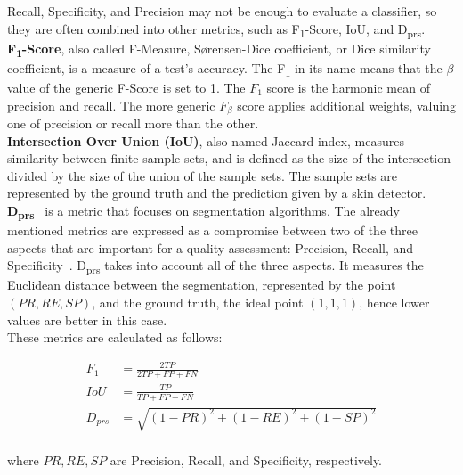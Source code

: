 \noindent Recall, Specificity, and Precision may not be enough to evaluate a classifier, so they are often combined into other metrics, such as F\textsubscript{1}-Score, IoU, and D\textsubscript{prs}.\\
\textbf{F\textsubscript{1}-Score}, also called F-Measure, Sørensen-Dice coefficient, or Dice similarity coefficient, is a measure of a test's accuracy.
The F\textsubscript{1} in its name means that the $\beta$ value of the generic F-Score is set to 1.
The $F_1$ score is the harmonic mean of precision and recall.
The more generic $F_\beta$ score applies additional weights, valuing one of precision or recall more than the other.\\
\textbf{Intersection Over Union (IoU)}, also named Jaccard index, measures similarity between finite sample sets, and is defined as the size of the intersection divided by the size of the union of the sample sets. The sample sets are represented by the ground truth and the prediction given by a skin detector.\\
\textbf{D\textsubscript{prs}}~\cite{intawong2013new} is a metric that focuses on segmentation algorithms. The already mentioned metrics are expressed as a compromise between two of the three aspects that are important for a quality assessment: Precision, Recall, and Specificity~\cite{intawong2013new}.
D\textsubscript{prs} takes into account all of the three aspects.
It measures the Euclidean distance between the segmentation, represented by the point $(PR, RE, SP)$, and the ground truth, the ideal point $(1, 1, 1)$, hence lower values are better in this case.\\
These metrics are calculated as follows:

\begin{equation}
    \begin{aligned}
    F_1&=\frac{2 T P}{2 T P+F P+F N}\\[10pt]
    IoU&=\frac{T P}{T P+F P+F N}\\[10pt]
    D_{p r s}&=\sqrt{(1-P R)^{2}+(1-R E)^{2}+(1-S P)^{2}}\\[10pt]
    \end{aligned}
\end{equation}

where $PR, RE, SP$ are Precision, Recall, and Specificity, respectively.


